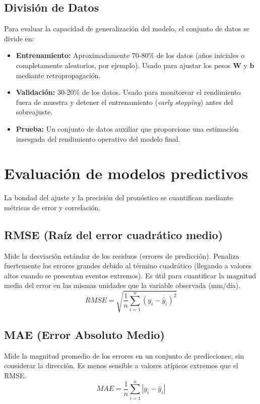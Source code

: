 \subsection{División de Datos}
Para evaluar la capacidad de generalización del modelo, el conjunto de datos se divide en:
\begin{itemize}
    \item \textbf{Entrenamiento:} Aproximadamente 70-80\% de los datos (años iniciales o completamente aleatorios, por ejemplo). Usado para ajustar los pesos \(\mathbf{W}\) y \(\mathbf{b}\) mediante retropropagación.
    \item \textbf{Validación:} 30-20\% de los datos. Usado para monitorear el rendimiento fuera de muestra y detener el entrenamiento (\textit{early stopping}) antes del sobreajuste.
    \item \textbf{Prueba:} Un conjunto de datos auxiliar que proporcione una estimación insesgada del rendimiento operativo del modelo final.
\end{itemize}

\section{Evaluación de modelos predictivos}

La bondad del ajuste y la precisión del pronóstico se cuantifican mediante métricas de error y correlación.

\subsection{RMSE (Raíz del error cuadrático medio)}
Mide la desviación estándar de los residuos (errores de predicción). Penaliza fuertemente los errores grandes debido al término cuadrático (llegando a valores altos cuando se presentan eventos extremos). Es útil para cuantificar la magnitud media del error en las mismas unidades que la variable observada (mm/día).
\begin{equation}
    RMSE = \sqrt{\frac{1}{n} \sum_{i=1}^{n} (y_i - \hat{y}_i)^2}
\end{equation}

\subsection{MAE (Error Absoluto Medio)}
Mide la magnitud promedio de los errores en un conjunto de predicciones, sin considerar la dirección. Es menos sensible a valores atípicos extremos que el RMSE.
\begin{equation}
    MAE = \frac{1}{n} \sum_{i=1}^{n} |y_i - \hat{y}_i|
\end{equation}

